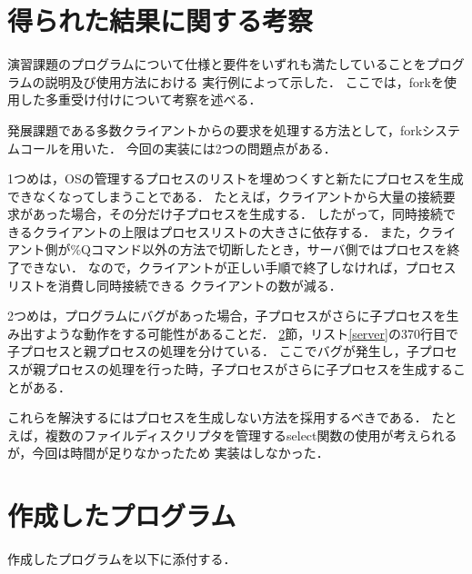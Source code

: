 \documentclass[11pt]{jarticle}
\begin{document}
\section{得られた結果に関する考察}

演習課題のプログラムについて仕様と要件をいずれも満たしていることをプログラムの説明及び使用方法における
実行例によって示した．
ここでは，forkを使用した多重受け付けについて考察を述べる．

発展課題である多数クライアントからの要求を処理する方法として，forkシステムコールを用いた．
今回の実装には2つの問題点がある．

1つめは，OSの管理するプロセスのリストを埋めつくすと新たにプロセスを生成できなくなってしまうことである．
たとえば，クライアントから大量の接続要求があった場合，その分だけ子プロセスを生成する．
したがって，同時接続できるクライアントの上限はプロセスリストの大きさに依存する．
また，クライアント側が\%Qコマンド以外の方法で切断したとき，サーバ側ではプロセスを終了できない．
なので，クライアントが正しい手順で終了しなければ，プロセスリストを消費し同時接続できる
クライアントの数が減る．

2つめは，プログラムにバグがあった場合，子プロセスがさらに子プロセスを生み出すような動作をする可能性があることだ．
\ref{sec:program}節，リスト\ref{server}の370行目で子プロセスと親プロセスの処理を分けている．
ここでバグが発生し，子プロセスが親プロセスの処理を行った時，子プロセスがさらに子プロセスを生成することがある．

これらを解決するにはプロセスを生成しない方法を採用するべきである．
たとえば，複数のファイルディスクリプタを管理するselect関数の使用が考えられるが，今回は時間が足りなかったため
実装はしなかった．

\section{作成したプログラム} \label{sec:program}

作成したプログラムを以下に添付する．
\end{document}
